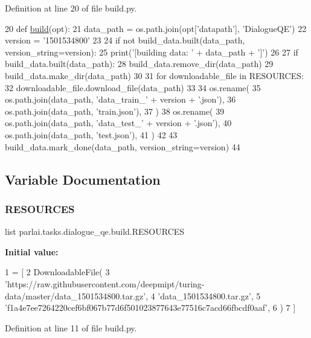 Definition at line 20 of file build.\+py.


\begin{DoxyCode}
20 \textcolor{keyword}{def }\hyperlink{namespacedialog__babi__feedback_1_1build_a7a9d289f7493a5ded13c4b7f071b6184}{build}(opt):
21     data\_path = os.path.join(opt[\textcolor{stringliteral}{'datapath'}], \textcolor{stringliteral}{'DialogueQE'})
22     version = \textcolor{stringliteral}{'1501534800'}
23 
24     \textcolor{keywordflow}{if} \textcolor{keywordflow}{not} build\_data.built(data\_path, version\_string=version):
25         print(\textcolor{stringliteral}{'[building data: '} + data\_path + \textcolor{stringliteral}{']'})
26 
27         \textcolor{keywordflow}{if} build\_data.built(data\_path):
28             build\_data.remove\_dir(data\_path)
29         build\_data.make\_dir(data\_path)
30 
31         \textcolor{keywordflow}{for} downloadable\_file \textcolor{keywordflow}{in} RESOURCES:
32             downloadable\_file.download\_file(data\_path)
33 
34         os.rename(
35             os.path.join(data\_path, \textcolor{stringliteral}{'data\_train\_'} + version + \textcolor{stringliteral}{'.json'}),
36             os.path.join(data\_path, \textcolor{stringliteral}{'train.json'}),
37         )
38         os.rename(
39             os.path.join(data\_path, \textcolor{stringliteral}{'data\_test\_'} + version + \textcolor{stringliteral}{'.json'}),
40             os.path.join(data\_path, \textcolor{stringliteral}{'test.json'}),
41         )
42 
43         build\_data.mark\_done(data\_path, version\_string=version)
44 \end{DoxyCode}


\subsection{Variable Documentation}
\mbox{\label{namespaceparlai_1_1tasks_1_1dialogue__qe_1_1build_af0ab4b4e1f87decf7c4ff7549518511a}} 
\subsubsection{\texorpdfstring{R\+E\+S\+O\+U\+R\+C\+ES}{RESOURCES}}
{\footnotesize\ttfamily list parlai.\+tasks.\+dialogue\+\_\+qe.\+build.\+R\+E\+S\+O\+U\+R\+C\+ES}

{\bfseries Initial value\+:}
\begin{DoxyCode}
1 =  [
2     DownloadableFile(
3         \textcolor{stringliteral}{'https://raw.githubusercontent.com/deepmipt/turing-data/master/data\_1501534800.tar.gz'},
4         \textcolor{stringliteral}{'data\_1501534800.tar.gz'},
5         \textcolor{stringliteral}{'f1a4e7ee7264220cef6bf067b77d6f501023877643e77516c7acd66fbcdf0aaf'},
6     )
7 ]
\end{DoxyCode}


Definition at line 11 of file build.\+py.

